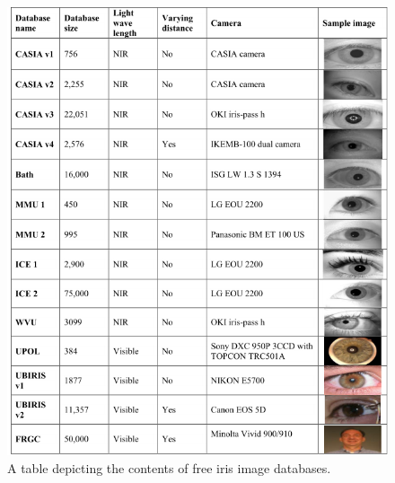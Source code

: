 \begin{figure}[H]
\centering
\includegraphics[width=\textwidth]{figures/Iris_Database_tabel_1.png} 
\caption{A table depicting the contents of free iris image databases.}
\label{fig:Iris_database_1}
\end{figure}

